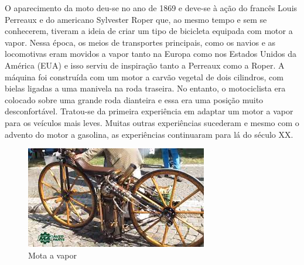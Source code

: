 \documentclass{report}
\begin{document}
O aparecimento da moto deu-se no ano de 1869 e deve-se à ação do francês Louis Perreaux e do americano Sylvester Roper que, ao mesmo tempo e sem se conhecerem, tiveram a ideia de criar um tipo de bicicleta equipada com motor a vapor. Nessa época, os meios de transportes principais, como os navios e as locomotivas eram movidos a vapor tanto na Europa como nos Estados Unidos da América (EUA) e isso serviu de inspiração tanto a Perreaux como a Roper. A máquina foi construída com um motor a carvão vegetal de dois cilindros, com bielas ligadas a uma manivela na roda traseira. No entanto, o motociclista era colocado sobre uma grande roda dianteira e essa era uma posição muito desconfortável. Tratou-se da primeira experiência em adaptar um motor a vapor para os veículos mais leves. Muitas outras experiências sucederam e mesmo com o advento do motor a gasolina, as experiências continuaram para lá do século XX.

\begin{figure}[h]
\center
\includegraphics[scale=0.8]{Mota a vapor.jpeg}  %
\caption{Mota a vapor}
\label{figura:Mota a vapor}
\end{figure}
\end{document}
